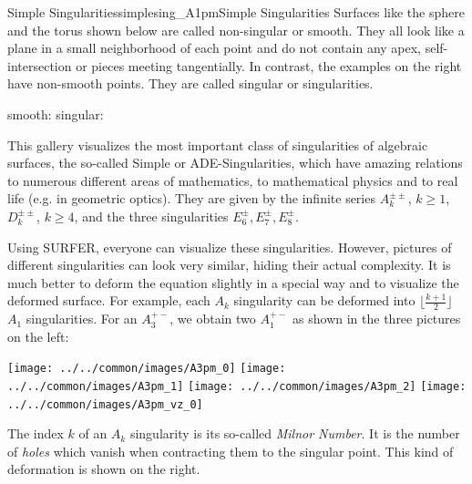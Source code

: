 \begin{surferIntroPage}{Simple Singularities}{simplesing_A1pm}{Simple Singularities}
	Surfaces like the sphere and the torus shown below are called non-singular or smooth. They all look like a plane in a small neighborhood of each point and do not contain any apex, self-intersection or pieces meeting tangentially. In contrast, the examples on the right have non-smooth points. They are called singular or singularities.
	\begin{center}%
		smooth:\enspace%
        \quad%
		singular:%
	\end{center}
	This gallery visualizes the most important class of singularities of algebraic surfaces, the so-called Simple or ADE-Singularities, which have amazing relations to numerous different areas of mathematics, to mathematical physics and to real life (e.g. in geometric optics). They are given by the infinite series $A_k^{\pm\pm}\!$, $k\geq 1$, $D_k^{\pm\pm}\!$, $k\geq 4$, and the three singularities $E^\pm_6\!, E^\pm_7\!, E^\pm_8\!$.

	Using SURFER, everyone can visualize these singularities. However, pictures of different singularities can look very similar, hiding their actual complexity. It is much better to deform the equation slightly in a special way and to visualize the deformed surface. For example, each $A_k$ singularity can be deformed into $\lfloor\frac{k+1}{2}\rfloor$ $A_1$ singularities. For an $A_3^{+-}$, we obtain two $A_1^{+-}$ as shown in the three pictures on the left:
	\vspace{-0.2cm}
	\begin{center}%
		\texttt{[image: ../../common/images/A3pm\_0]}\enspace%
		\texttt{[image: ../../common/images/A3pm\_1]}\enspace%
		\texttt{[image: ../../common/images/A3pm\_2]}\enspace%
		\qquad\quad%
		\enspace%
		\enspace%
		\texttt{[image: ../../common/images/A3pm\_vz\_0]}
	\end{center}
	\vspace{-0.2cm}
	The index $k$ of an $A_k$ singularity is its so-called \emph{Milnor Number}. It is the number of \emph{holes} which vanish when contracting them to the singular point. This kind of deformation is shown on the right.
\end{surferIntroPage}
